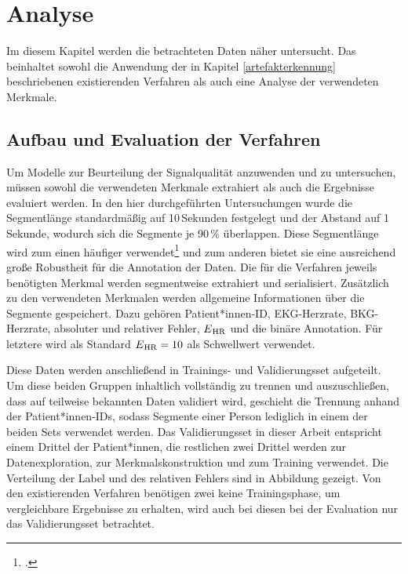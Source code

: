 \chapter{Analyse}\label{analyse}

Im diesem Kapitel werden die betrachteten Daten näher untersucht. Das beinhaltet sowohl die Anwendung der in Kapitel \ref{artefakterkennung} beschriebenen existierenden Verfahren als auch eine Analyse der verwendeten Merkmale.

\section{Aufbau und Evaluation der Verfahren}

Um Modelle zur Beurteilung der Signalqualität anzuwenden und zu untersuchen, müssen sowohl die verwendeten Merkmale extrahiert als auch die Ergebnisse evaluiert werden. In den hier durchgeführten Untersuchungen wurde die Segmentlänge standardmäßig auf 10\,Sekunden festgelegt und der Abstand auf 1\,Sekunde, wodurch sich die Segmente je 90\,\% überlappen. Diese Segmentlänge wird zum einen häufiger verwendet\footcite[Vgl.][]{Yu2020, Sadek2016, Orphanidou2015} und zum anderen bietet sie eine ausreichend große Robustheit für die Annotation der Daten. Die für die Verfahren jeweils benötigten Merkmal werden segmentweise extrahiert und serialisiert. Zusätzlich zu den verwendeten Merkmalen werden allgemeine Informationen über die Segmente gespeichert. Dazu gehören Patient*innen-ID, EKG-Herzrate, BKG-Herzrate, absoluter und relativer Fehler, $E\textsubscript{HR}$ und die binäre Annotation. Für letztere wird als Standard $E\textsubscript{HR} = 10$ als Schwellwert verwendet.

Diese Daten werden anschließend in Trainings- und Validierungsset aufgeteilt. Um diese beiden Gruppen inhaltlich vollständig zu trennen und auszuschließen, dass auf teilweise bekannten Daten validiert wird, geschieht die Trennung anhand der Patient*innen-IDs, sodass Segmente einer Person lediglich in einem der beiden Sets verwendet werden. Das Validierungsset in dieser Arbeit entspricht einem Drittel der Patient*innen, die restlichen zwei Drittel werden zur Datenexploration, zur Merkmalskonstruktion und zum Training verwendet. Die Verteilung der Label und des relativen Fehlers sind in Abbildung %
gezeigt. Von den existierenden Verfahren benötigen zwei keine Trainingsphase, um vergleichbare Ergebnisse zu erhalten, wird auch bei diesen bei der Evaluation nur das Validierungsset betrachtet.

